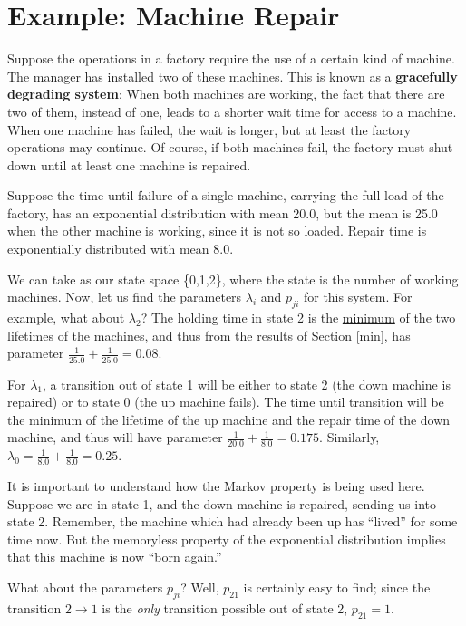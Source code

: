 \section{Example:  Machine Repair}
\label{machinerepairxxx}

Suppose the operations in a factory require the use of a certain kind of
machine.  The manager has installed two of these machines. This is known
as a \textbf{gracefully degrading system}: When both machines are
working, the fact that there are two of them, instead of one, leads to a
shorter wait time for access to a machine.  When one machine has failed,
the wait is longer, but at least the factory operations may continue. Of
course, if both machines fail, the factory must shut down until at least
one machine is repaired.

Suppose the time until failure of a single machine, carrying the full
load of the factory, has an exponential distribution with mean 20.0, but
the mean is 25.0 when the other machine is working, since it is not so
loaded. Repair time is exponentially distributed with mean 8.0.

We can take as our state space \{0,1,2\}, where the state is the number
of working machines. Now, let us find the parameters $\lambda_{i}$ and
$p_{ji}$ for this system. For example, what about $\lambda_{2}$?  The
holding time in state 2 is the \underline{minimum} of the two lifetimes
of the machines, and thus from the results of Section \ref{min}, has
parameter $\frac{1}{25.0}+\frac{1}{25.0}=0.08$. 

For $\lambda_{1}$, a transition out of state 1 will be either to state
2 (the down machine is repaired) or to state 0 (the up machine fails).
The time until transition will be the minimum of the lifetime of the up
machine and the repair time of the down machine, and thus will have
parameter $\frac{1}{20.0}+\frac{1}{8.0}=0.175$.  Similarly, $\lambda
_{0}=\frac{1}{8.0}+\frac{1}{8.0}=0.25$.

It is important to understand how the Markov property is being used
here. Suppose we are in state 1, and the down machine is repaired,
sending us into state 2.  Remember, the machine which had already been
up has ``lived'' for some time now. But the memoryless property of the
exponential distribution implies that this machine is now ``born
again.''

What about the parameters $p_{ji}$? Well, $p_{21}$ is certainly easy to
find; since the transition $2\rightarrow 1$ is the \textit{only}
transition possible out of state 2, $p_{21} = 1$.


